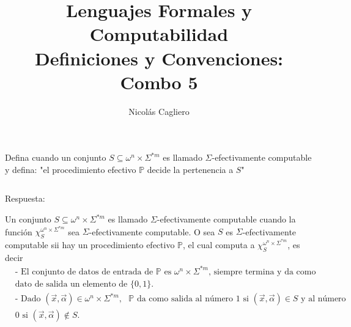 \documentclass{article}
\title{Lenguajes Formales y Computabilidad \\
        \large Definiciones y Convenciones: Combo 5 }
\author{Nicolás Cagliero}
\begin{document}
\maketitle

Defina cuando un conjunto $S \subseteq \omega^n \times \Sigma^{*m}$
es llamado $\Sigma$-efectivamente computable y defina: "el procedimiento
efectivo $\mathbb{P}$ decide la pertenencia a $S$"

\(\)
\begin{center}
    Respuesta: 
    \(\)
\end{center}

Un conjunto $S \subseteq \omega^n \times \Sigma^{*m}$
es llamado $\Sigma$-efectivamente computable cuando la función
$\chi_{S}^{\omega^n \times \Sigma^{*m}}$ sea $\Sigma$-efectivamente
computable. O sea $S$ es $\Sigma$-efectivamente computable
sii hay un procedimiento efectivo $\mathbb{P}$, el cual 
computa a $\chi_{S}^{\omega^n \times \Sigma^{*m}}$, es decir
\begin{align*}
        &\text{- El conjunto de datos de entrada de }
        \mathbb{P} \text{ es } \omega^n \times \Sigma^{*m} 
        \text{, siempre termina y da como }\\
        &\text{dato de salida un elemento de } \{0, 1\}.\\
        &\text{- Dado }(\overset{\rightarrow}{x}, \overset{\rightarrow}{\alpha})
        \in \omega^n \times \Sigma^{*m}, \text{ } \mathbb{P} 
        \text{ da como salida al número } 1 \text{ si }
        (\overset{\rightarrow}{x}, \overset{\rightarrow}{\alpha}) \in
        S \text{ y al número }\\
        &0 \text{ si } (\overset{\rightarrow}{x}, \overset{\rightarrow}{\alpha}) \notin S. 
\end{align*}
\end{document}
